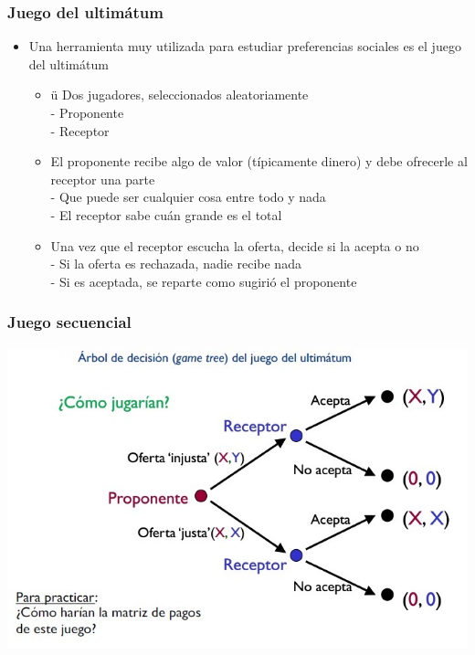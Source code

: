 \documentclass{beamer}
\begin{document}
\begin{frame}
\frametitle{ Juego del ultimátum}
\begin{itemize}
        \item Una herramienta muy utilizada para estudiar preferencias sociales es el juego del ultimátum
        \begin{itemize}
            \item ü Dos jugadores, seleccionados aleatoriamente \\ 
            - Proponente \\
            - Receptor
            \item El proponente recibe algo de valor (típicamente dinero) y debe ofrecerle al receptor una parte \\
            - Que puede ser cualquier cosa entre todo y nada \\
            - El receptor sabe cuán grande es el total
            \item Una vez que el receptor escucha la oferta, decide si la acepta o no \\
            - Si la oferta es rechazada, nadie recibe nada \\
            - Si es aceptada, se reparte como sugirió el proponente
        \end{itemize}
\end{itemize}
\end{frame}

\begin{frame}
\frametitle{ Juego secuencial}
\centering
\includegraphics[scale=0.6]{Figures/Tema_03_29_arbol.jpg}
\end{frame}
\end{document}

